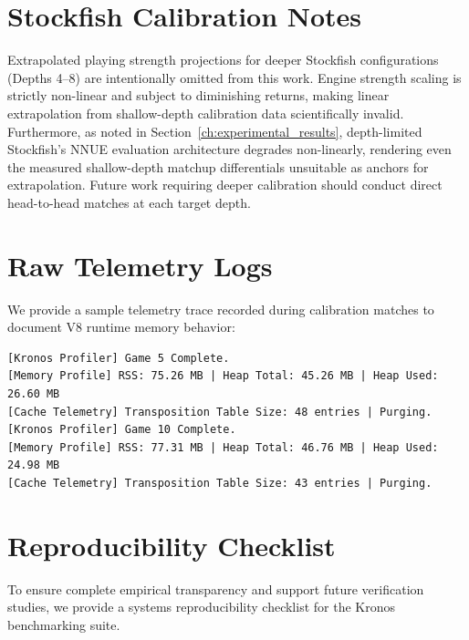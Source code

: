 \chapter{Stockfish Calibration Notes}
\label{app:sf_notes}

Extrapolated playing strength projections for deeper Stockfish configurations (Depths 4--8) are intentionally omitted from this work. Engine strength scaling is strictly non-linear and subject to diminishing returns, making linear extrapolation from shallow-depth calibration data scientifically invalid. Furthermore, as noted in Section~\ref{ch:experimental_results}, depth-limited Stockfish's NNUE evaluation architecture degrades non-linearly, rendering even the measured shallow-depth matchup differentials unsuitable as anchors for extrapolation. Future work requiring deeper calibration should conduct direct head-to-head matches at each target depth.


\chapter{Raw Telemetry Logs}
\label{app:telemetry}
We provide a sample telemetry trace recorded during calibration matches to document V8 runtime memory behavior:

\begin{verbatim}
[Kronos Profiler] Game 5 Complete.
[Memory Profile] RSS: 75.26 MB | Heap Total: 45.26 MB | Heap Used: 26.60 MB
[Cache Telemetry] Transposition Table Size: 48 entries | Purging.
[Kronos Profiler] Game 10 Complete.
[Memory Profile] RSS: 77.31 MB | Heap Total: 46.76 MB | Heap Used: 24.98 MB
[Cache Telemetry] Transposition Table Size: 43 entries | Purging.
\end{verbatim}

\chapter{Reproducibility Checklist}
\label{app:checklist}

To ensure complete empirical transparency and support future verification studies, we provide a systems reproducibility checklist for the Kronos benchmarking suite.

